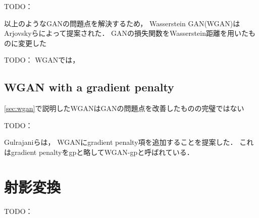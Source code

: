 \documentclass[\homedir/main.tex]{subfiles}
\begin{document}
TODO：

以上のようなGANの問題点を解決するため，
Wasserstein GAN(WGAN)は
Arjovskyら\cite{pmlr-v70-arjovsky17a}によって提案された．
GANの損失関数をWasserstein距離を用いたものに変更した

TODO：
WGANでは，

\subsection{WGAN with a gradient penalty}\label{sec:wgan_gp}
\cref{sec:wgan}で説明したWGANはGANの問題点を改善したものの完璧ではない

TODO：

Gulrajaniら\cite{NIPS2017_892c3b1c}は，
WGANにgradient penalty項を追加することを提案した．
これはgradient penaltyをgpと略してWGAN-gpと呼ばれている．

\section{射影変換}\label{sec:projective_transformation}

TODO：

\printBibForSubfiles
\end{document}
